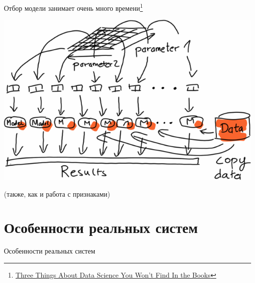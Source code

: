 \documentclass[aspectratio=169]{beamer}
\begin{document}
\begin{frame}{Отбор модели занимает очень много времени\footnote{\href{http://blog.mikiobraun.de/2015/03/three-things-about-data-science.html}{Three Things About Data Science You Won't Find In the Books}}}

\begin{center}
\includegraphics[scale=0.3]{images/evaluation.png}
\end{center}

(также, как и работа с признаками)

\end{frame}


\section{Особенности реальных систем}


\begin{frame}{}

\begin{center}
\Large Особенности реальных систем
\end{center}

\end{frame}
\end{document}
